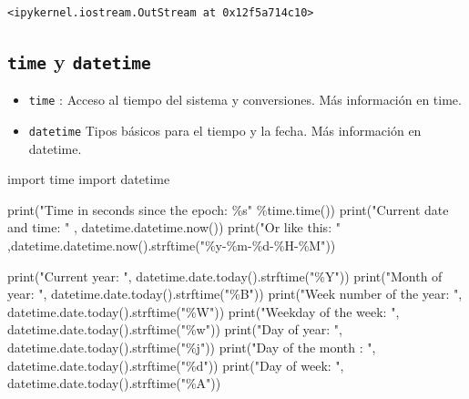 \documentclass[
  spanish,
  letterpaper,
]{scrbook}
\newenvironment{Shaded}{\begin{snugshade}}{\end{snugshade}}
\newcommand{\BuiltInTok}[1]{\textcolor[rgb]{0.00,0.23,0.31}{#1}}
\newcommand{\ImportTok}[1]{\textcolor[rgb]{0.00,0.46,0.62}{#1}}
\newcommand{\NormalTok}[1]{\textcolor[rgb]{0.00,0.23,0.31}{#1}}
\newcommand{\OperatorTok}[1]{\textcolor[rgb]{0.37,0.37,0.37}{#1}}
\newcommand{\SpecialCharTok}[1]{\textcolor[rgb]{0.37,0.37,0.37}{#1}}
\newcommand{\StringTok}[1]{\textcolor[rgb]{0.13,0.47,0.30}{#1}}
\theoremstyle{definition}
\theoremstyle{remark}
\begin{document}
\begin{verbatim}
<ipykernel.iostream.OutStream at 0x12f5a714c10>
\end{verbatim}

\subsection{\texorpdfstring{\texttt{time} y
\texttt{datetime}}{time y datetime}}\label{time-y-datetime}

\begin{itemize}
\item
  \texttt{time} : Acceso al tiempo del sistema y conversiones. Más
  información en time.
\item
  \texttt{datetime} Tipos básicos para el tiempo y la fecha. Más
  información en datetime.
\end{itemize}

\begin{Shaded}
\begin{Highlighting}[]
\ImportTok{import}\NormalTok{ time}
\ImportTok{import}\NormalTok{ datetime}

\BuiltInTok{print}\NormalTok{(}\StringTok{"Time in seconds since the epoch: }\SpecialCharTok{\%s}\StringTok{"} \OperatorTok{\%}\NormalTok{time.time())}
\BuiltInTok{print}\NormalTok{(}\StringTok{"Current date and time: "}\NormalTok{ , datetime.datetime.now())}
\BuiltInTok{print}\NormalTok{(}\StringTok{"Or like this: "}\NormalTok{ ,datetime.datetime.now().strftime(}\StringTok{"\%y{-}\%m{-}}\SpecialCharTok{\%d}\StringTok{{-}\%H{-}\%M"}\NormalTok{))}


\BuiltInTok{print}\NormalTok{(}\StringTok{"Current year: "}\NormalTok{, datetime.date.today().strftime(}\StringTok{"\%Y"}\NormalTok{))}
\BuiltInTok{print}\NormalTok{(}\StringTok{"Month of year: "}\NormalTok{, datetime.date.today().strftime(}\StringTok{"\%B"}\NormalTok{))}
\BuiltInTok{print}\NormalTok{(}\StringTok{"Week number of the year: "}\NormalTok{, datetime.date.today().strftime(}\StringTok{"\%W"}\NormalTok{))}
\BuiltInTok{print}\NormalTok{(}\StringTok{"Weekday of the week: "}\NormalTok{, datetime.date.today().strftime(}\StringTok{"\%w"}\NormalTok{))}
\BuiltInTok{print}\NormalTok{(}\StringTok{"Day of year: "}\NormalTok{, datetime.date.today().strftime(}\StringTok{"\%j"}\NormalTok{))}
\BuiltInTok{print}\NormalTok{(}\StringTok{"Day of the month : "}\NormalTok{, datetime.date.today().strftime(}\StringTok{"}\SpecialCharTok{\%d}\StringTok{"}\NormalTok{))}
\BuiltInTok{print}\NormalTok{(}\StringTok{"Day of week: "}\NormalTok{, datetime.date.today().strftime(}\StringTok{"\%A"}\NormalTok{))}
\end{Highlighting}
\end{Shaded}
\end{document}
